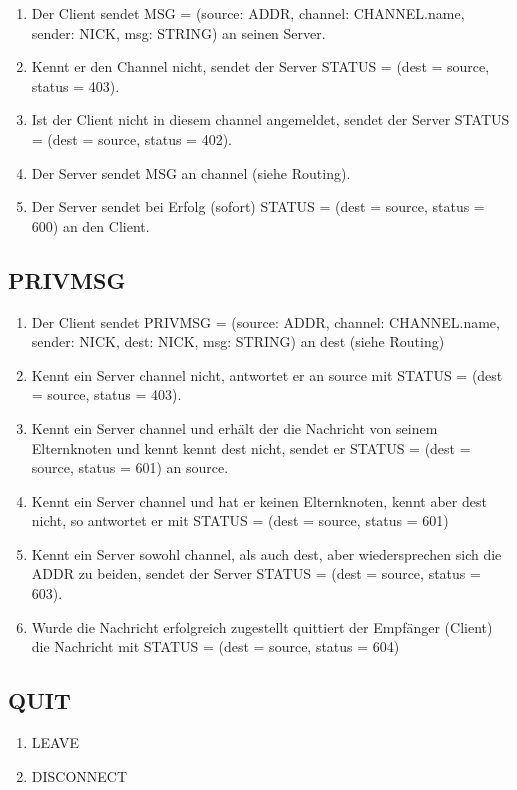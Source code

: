 \documentclass{article}
\begin{document}
\begin{enumerate}
  \item Der Client sendet MSG = (source: ADDR, channel: CHANNEL.name, sender: NICK, msg: STRING) an seinen Server.
  \item Kennt er den Channel nicht, sendet der Server STATUS = (dest = source, status = 403).
  \item Ist der Client nicht in diesem channel angemeldet, sendet der Server STATUS = (dest = source, status = 402).
  \item Der Server sendet MSG an channel (siehe Routing).
  \item Der Server sendet bei Erfolg (sofort) STATUS = (dest = source, status = 600) an den Client.
\end{enumerate}

\subsection{PRIVMSG}

\begin{enumerate}
  \item Der Client sendet PRIVMSG = (source: ADDR, channel: CHANNEL.name, sender: NICK, dest: NICK, msg: STRING) an dest (siehe Routing)
  \item Kennt ein Server channel nicht, antwortet er an source mit STATUS = (dest = source, status = 403).
  \item Kennt ein Server channel und erhält der die Nachricht von seinem Elternknoten und kennt kennt dest nicht, sendet er STATUS = (dest = source, status = 601) an source.
  \item Kennt ein Server channel und hat er keinen Elternknoten, kennt aber dest nicht, so antwortet er mit STATUS = (dest = source, status = 601)
  \item Kennt ein Server sowohl channel, als auch dest, aber wiedersprechen sich die ADDR zu beiden, sendet der Server STATUS = (dest = source, status = 603).
  \item Wurde die Nachricht erfolgreich zugestellt quittiert der Empfänger (Client) die Nachricht mit STATUS = (dest = source, status = 604)
\end{enumerate}

\subsection{QUIT}

\begin{enumerate}
  \item LEAVE
  \item DISCONNECT
\end{enumerate}
\end{document}
